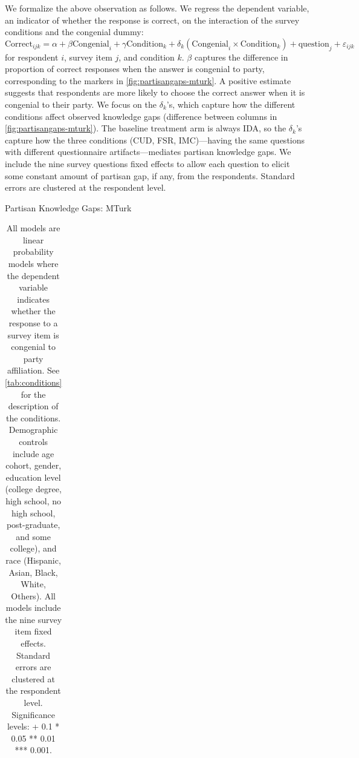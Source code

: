 \documentclass[12pt, letterpaper]{article}
\begin{document}
We formalize the above observation as follows. We regress the dependent variable, an indicator of whether the response is correct, on the interaction of the survey conditions and the congenial dummy:
\begin{equation}\label{eq:partisangap-mturk}
\text{Correct}_{ijk} = \alpha + \beta \text{Congenial}_i + \gamma \text{Condition}_k + \delta_k (\text{Congenial}_i \times \text{Condition}_k) + \text{question}_j + \varepsilon_{ijk}
\end{equation}
for respondent $i$, survey item $j$, and condition $k$. $\beta$ captures the difference in proportion of correct responses when the answer is congenial to party, corresponding to the markers in \cref{fig:partisangaps-mturk}. A positive estimate suggests that respondents are more likely to choose the correct answer when it is congenial to their party. We focus on the $\delta_k$'s, which capture how the different conditions affect observed knowledge gaps (difference between columns in \cref{fig:partisangaps-mturk}). The baseline treatment arm is always IDA, so the $\delta_k$'s capture how the three conditions (CUD, FSR, IMC)---having the same questions with different questionnaire artifacts---mediates partisan knowledge gaps.
We include the nine survey questions fixed effects to allow each question to elicit some constant amount of partisan gap, if any, from the respondents. Standard errors are clustered at the respondent level.

\begin{table}[t] \centering \small \setlength\tabcolsep{0 pt} \setlength{\defaultaddspace}{0pt}
	\def\sym#1{\ifmmode^{#1}\else\(^{#1}\)\fi}
	\caption{Partisan Knowledge Gaps: MTurk}
	\label{tab:partisangaps-mturk}
	\begin{adjustbox}{max width=\textwidth}
		\begin{tabular}{l*{6}{D{.}{.}{-1}}}
			\toprule
			
			\bottomrule
		\end{tabular}
	\end{adjustbox}
	\caption*{\footnotesize All models are linear probability models where the dependent variable indicates whether the response to a survey item is congenial to party affiliation.
		See \cref{tab:conditions} for the description of the conditions.
	Demographic controls include age cohort, gender, education level (college degree, high school, no high school, post-graduate, and some college), and race (Hispanic, Asian, Black, White, Others). All models include the nine survey item fixed effects. Standard errors are clustered at the respondent level. Significance levels: + 0.1 * 0.05 ** 0.01 *** 0.001.}
\end{table}
\end{document}
